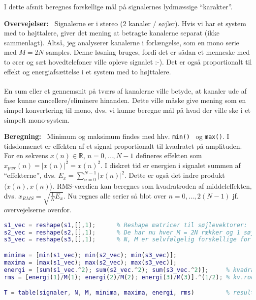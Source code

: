 \documentclass[a4paper]{report}
\begin{document}
        \begin{par}

I dette afsnit beregnes forskellige mål på signalernes lydmæssige ``karakter''.\\

\end{par} 
\begin{par}

\textbf{Overvejelser:}~
Signalerne er i stereo (2 kanaler / søjler).
Hvis vi har et system med to højttalere, giver det mening at betragte kanalerne separat (ikke sammenlagt).
Altså, jeg analyserer kanalerne i forlængelse, som en mono serie med $M=2N$ samples.
Denne løsning bruges, fordi det er sådan et menneske med to ører og sæt hovedtelefoner ville opleve signalet :-).
Det er også proportionalt til effekt og energiafsættelse i et system med to højttalere.\\\\
En sum eller et gennemsnit på tværs af kanalerne ville betyde, at kanaler
ude af fase kunne cancellere/eliminere hinanden.
Dette ville måske give mening som en simpel konvertering til mono, dvs. vi
kunne beregne mål på hvad der ville ske i et simpelt mono-system.\\

\end{par} 
\begin{par}

\textbf{Beregning:}~
Minimum og maksimum findes med hhv. \texttt{min()}~ og \texttt{max()}.
I tidsdomænet er effekten af et signal proportionalt til kvadratet på
amplituden. For en sekvens $x(n) \in \mathbb{R}$, $n = 0,\ldots,N-1$
defineres effekten som $x_{pwr}(n) = |x(n)|^2 = x(n)^2 $.
I diskret tid er energien i signalet summen af ``effekterne'', dvs.
$E_x = \sum_{n=0}^{N-1} |x(n)|^2 $.
Dette er også det indre produkt $\langle x(n), x(n) \rangle$.
RMS-værdien kan beregnes som kvadratroden af middeleffekten, dvs.
$x_{RMS} = \sqrt{\frac{1}{N}E_x}$.
Nu regnes alle serier så blot over $n = 0, \ldots, 2(N-1)$ jf. overvejelserne ovenfor.\\

\end{par} 

\begin{lstlisting}[language=Matlab, style=Matlab-editor]
s1_vec = reshape(s1,[],1);      % Reshape matricer til søjlevektorer:
s2_vec = reshape(s2,[],1);      % De har nu hver M = 2N rækker og 1 søjle
s3_vec = reshape(s3,[],1);      % N, M er selvfølgelig forskellige for hver

minima = [min(s1_vec); min(s2_vec); min(s3_vec)];
maxima = [max(s1_vec); max(s2_vec); max(s3_vec)];
energi = [sum(s1_vec.^2); sum(s2_vec.^2); sum(s3_vec.^2)];     % kvadratsum
rms = [energi(1)/M(1); energi(2)/M(2); energi(3)/M(3)].^(1/2); % kv.rod

T = table(signaler, N, M, minima, maxima, energi, rms)         % resultater
\end{lstlisting}
\end{document}
